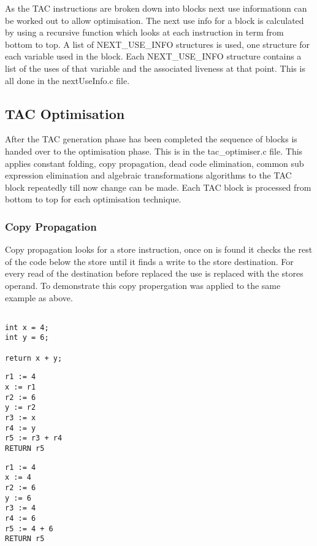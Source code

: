 \documentclass{article}
\begin{document}
As the TAC instructions are broken down into blocks next use informationn can be
worked out to allow optimisation. The next use info for a block is calculated by
using a recursive function which looks at each instruction in term from bottom
to top. A list of NEXT\_USE\_INFO structures is used, one structure for each variable
used in the block. Each NEXT\_USE\_INFO structure contains a list of the uses of that
variable and the associated liveness at that point. This is all done in the nextUseInfo.c file.

\subsection{TAC Optimisation}

After the TAC generation phase has been completed the sequence of blocks is handed
over to the optimisation phase. This is in the tac\_optimiser.c file. This applies
constant folding, copy propagation, dead code elimination, common sub expression
elimination and algebraic transformations algorithms to the TAC block repeatedly till
now change can be made. Each TAC block is processed from bottom to top for each
optimisation technique.

\subsubsection{Copy Propagation}

Copy propagation looks for a store instruction, once on is found it checks the
rest of the code below the store until it finds a write to the store destination.
For every read of the destination before replaced the use is replaced with the
stores operand. To demonstrate this copy propergation was applied to the same example
as above.

\begin{minipage}{0.3\textwidth}
\begin{lstlisting}

int x = 4;
int y = 6;

return x + y;

\end{lstlisting}
\end{minipage}%
\begin{minipage}{0.3\textwidth}
\begin{lstlisting}
r1 := 4
x := r1
r2 := 6
y := r2
r3 := x
r4 := y
r5 := r3 + r4
RETURN r5

\end{lstlisting}
\end{minipage}%
\begin{minipage}{0.3\textwidth}
\begin{lstlisting}
r1 := 4
x := 4
r2 := 6
y := 6
r3 := 4
r4 := 6
r5 := 4 + 6
RETURN r5
\end{lstlisting}
\end{minipage}%
\end{document}
